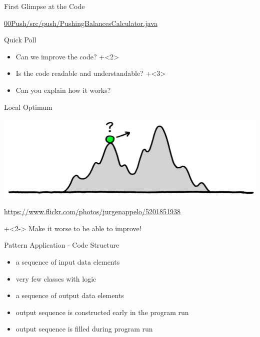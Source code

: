 \begin{frame}[fragile]{First Glimpse at the Code}

\begin{center}
{\large \url{00Push/src/push/PushingBalancesCalculator.java}}
\end{center}
\end{frame}

\begin{frame}[fragile]{Quick Poll}

\begin{itemize}
\onslide+<1>
\item Can we improve the code?
\onslide+<2>
\item Is the code readable and understandable?
\onslide+<3>
\item Can you explain how it works?
\end{itemize}

\end{frame}

\begin{frame}[fragile]{Local Optimum}

{
\begin{center}
\includegraphics[width=\textwidth]{LocalOptimum.jpg}
\end{center}
\vspace{-1.7em}
\hfill \tiny{\url{https://www.flickr.com/photos/jurgenappelo/5201851938}}
}

\onslide+<2->
\vspace{2em}
Make it worse to be able to improve!

\end{frame}

\begin{frame}[fragile]{Pattern Application - Code Structure}

\begin{itemize}
\item a sequence of input data elements
\item very few classes with logic
\item a sequence of output data elements 
\item output sequence is constructed early in the program run
\item output sequence is filled during program run
\end{itemize}

\end{frame}

